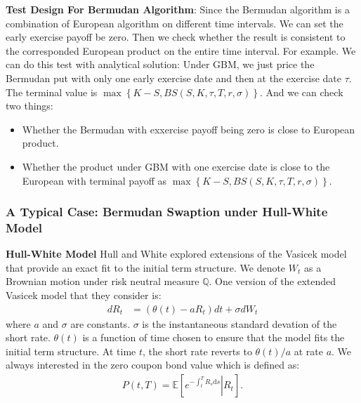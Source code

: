 \documentclass[11pt,a4paper]{article}
\theoremstyle{remark}
\begin{document}
	\noindent \textbf{Test Design For Bermudan Algorithm}:
	Since the Bermudan algorithm is a combination of European algorithm on different time intervals. We can set the early exercise payoff be zero. Then we check whether the result is consistent to the corresponded European product on the entire time interval. For example. We can do this test with analytical solution: Under GBM, we just price the Bermudan put with only one early exercise date and then at the exercise date $\tau$. The terminal value is $\max\left\{K - S, BS(S, K, \tau, T, r, \sigma)\right\}$. And we can check two things:
	\begin{itemize}
		\item Whether the Bermudan with exxercise payoff being zero is close to European product.
		\item Whether the product under GBM with one exercise date is close to the European with terminal payoff as $\max\left\{K - S, BS(S, K, \tau, T, r, \sigma)\right\}$.
	\end{itemize}
	
	\subsubsection{A Typical Case: Bermudan Swaption under Hull-White Model}
	\noindent \textbf{Hull-White Model}
	Hull and White explored extensions of the Vasicek model that provide an exact fit to the initial term structure. We denote $W_t$ as a Brownian motion under risk neutral measure $\mathbb{Q}$. One version of the extended Vasicek model that they consider is:
	\begin{align} \label{sde: HW}
		d R_t & = (\theta(t) - a R_t) dt + \sigma dW_t
	\end{align}
	where $a$ and $\sigma$ are constants. $\sigma$ is the instantaneous standard devation of the short rate. $\theta(t)$ is a function of time chosen to ensure that the model fits the initial term structure. At time $t$, the short rate reverts to $\theta(t)/a$ at
	rate $a$. We always interested in the zero coupon bond value which is defined as:
	\begin{align} 
		P(t, T) = \mathbb{E}\left[  \left. e^{-\int_t^T R_s \mathrm{d} s} \right| R_t\right].
	\end{align}
	
\end{document}
